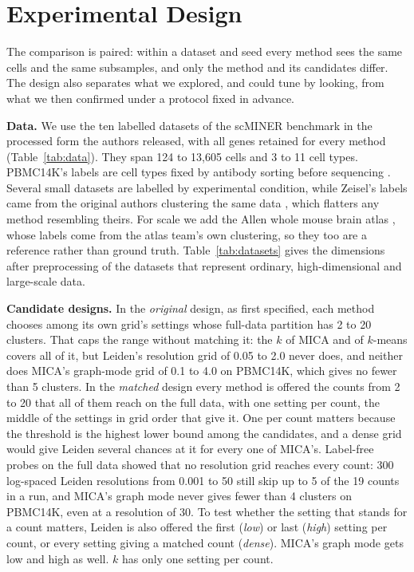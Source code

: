 \section{Experimental Design}\label{sec:design}
The comparison is paired: within a dataset and seed every method sees the same cells and the same
subsamples, and only the method and its candidates differ. The design also separates what we explored,
and could tune by looking, from what we then confirmed under a protocol fixed in advance.

\textbf{Data.} We use the ten labelled datasets of the scMINER benchmark in the processed form the authors
released, with all genes retained for every method (Table~\ref{tab:data}). They span 124 to 13,605
cells and 3 to 11 cell types. PBMC14K's labels are cell types fixed by antibody sorting before
sequencing \cite{zheng2017massively}. Several small datasets are labelled by experimental condition,
while Zeisel's labels came from the original authors clustering the same data \cite{zeisel2015cell},
which flatters any method resembling theirs. For scale we add the Allen whole mouse brain atlas
\cite{yao2023allen}, whose labels come from the atlas team's own clustering, so they too are a reference
rather than ground truth. Table~\ref{tab:datasets} gives the dimensions after preprocessing of the
datasets that represent ordinary, high-dimensional and large-scale data.



\textbf{Candidate designs.} In the \emph{original} design, as first specified, each method chooses among
its own grid's settings whose full-data partition has 2 to 20 clusters. That caps the range without
matching it: the $k$ of MICA and of $k$-means covers all of it, but Leiden's resolution grid of 0.05 to 2.0 never does, and neither does MICA's graph-mode grid of 0.1 to 4.0 on PBMC14K, which gives no fewer than 5 clusters. In the \emph{matched} design every method is offered the counts from 2 to
20 that all of them reach on the full data, with one setting per count, the middle of the settings in
grid order that give it. One per count matters because the threshold is the highest lower bound among
the candidates, and a dense grid would give Leiden several chances at it for every one of MICA's.
Label-free probes on the full data showed that no resolution grid reaches every count: 300 log-spaced
Leiden resolutions from 0.001 to 50 still skip up to 5 of the 19 counts in a run, and MICA's graph mode
never gives fewer than 4 clusters on PBMC14K, even at a resolution of 30. To test whether the setting
that stands for a count matters, Leiden is also offered the first (\emph{low}) or last (\emph{high})
setting per count, or every setting giving a matched count (\emph{dense}). MICA's graph mode gets low
and high as well. $k$ has only one setting per count.


